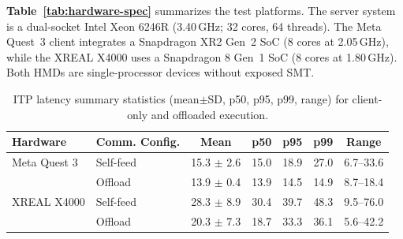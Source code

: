 {\bf Table~\ref{tab:hardware-spec}} summarizes the test platforms. 
The server system is a dual-socket Intel Xeon 6246R (3.40\,GHz; 32 cores, 64 threads). 
The Meta Quest~3 client integrates a Snapdragon XR2 Gen~2 SoC (8 cores at 2.05\,GHz), while the XREAL X4000 uses a Snapdragon 8 Gen~1 SoC (8 cores at 1.80\,GHz). 
Both HMDs are single-processor devices without exposed SMT. 



\begin{table}[t]
\caption{ITP latency summary statistics (mean$\pm$SD, p50, p95, p99, range) for client-only and offloaded execution.}
\label{tab:network-analysis} 
\centering
\setlength{\tabcolsep}{0.75\tabcolsep}
\renewcommand{\arraystretch}{1.5}
\scriptsize
\begin{tabular*}{\columnwidth}{@{} p{29pt} p{29pt} ccccc @{}}
\toprule
Hardware & Comm. Config. & Mean & p50 & p95 & p99 & Range \\
\midrule
Meta Quest 3
  & Self-feed & 15.3 $\pm$ 2.6 & 15.0 & 18.9 & 27.0 & 6.7--33.6 \\
  & Offload & 13.9 $\pm$ 0.4 & 13.9 & 14.5 & 14.9 & 8.7--18.4 \\
\midrule
XREAL X4000
  & Self-feed & 28.3 $\pm$ 8.9 & 30.4 & 39.7 & 48.3 & 9.5--76.0 \\
  & Offload & 20.3 $\pm$ 7.3 & 18.7 & 33.3 & 36.1 & 5.6--42.2 \\
\bottomrule
\end{tabular*}
\end{table}


